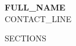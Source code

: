 \newcommand{\resumeEducationSubheading}[4]{\resumeSubheading{#1}{#2}{#3}{#4}}

\renewcommand\labelitemi{$\vcenter{\hbox{\tiny$\bullet$}}$}
\renewcommand\labelitemii{$\vcenter{\hbox{\tiny$\bullet$}}$}

\newcommand{\resumeSubHeadingListStart}{\begin{itemize}[leftmargin=0.0in, label={}]}
\newcommand{\resumeSubHeadingListEnd}{\end{itemize}}
\newcommand{\resumeItemListStart}{\begin{itemize}}
\newcommand{\resumeItemListEnd}{\end{itemize}\vspace{-5pt}}



\begin{center}
    {\Huge \sffamily\bfseries \color{accent} {{FULL_NAME}}} \\ \vspace{4pt}
    \small {{CONTACT_LINE}}
    \vspace{-8pt}
\end{center}
\par\vspace{1pt}

{{SECTIONS}}


